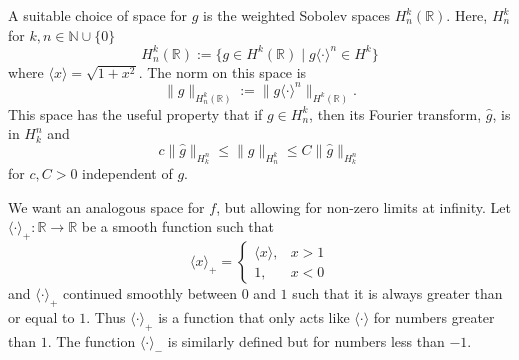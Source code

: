 \documentclass[oneside,reqno]{amsart}
\newcommand{\R}{\mathbb{R}}
\begin{document}
A suitable choice of space for \(g\) is the weighted Sobolev spaces \(H^k_n(\R)\). Here, \(H^k_n\) for \(k,n\in\mathbb N\cup \{0\}\)
\begin{equation*}
	H^k_n(\R) := \{ g\in H^k(\R) \mid   g\langle \cdot \rangle^n \in H^k \}
\end{equation*}
where \(\langle x \rangle = \sqrt{1+x^2}\). The norm on this space is
\begin{equation*}
	\| g \|_{H^k_n(\R)} := \|  g \langle \cdot \rangle^n\|_{H^k(\R)}.
\end{equation*}
This space has the useful property that if \(g \in H^k_n\), then its Fourier transform, \(\hat g \), is in \(H^n_k\) and 
\begin{equation*}
	c \| \hat g \|_{H^n_k} \leq \| g \|_{H^k_n} \leq C \| \hat g \|_{H^n_k}
\end{equation*}
for \(c,C>0\) independent of \(g\).

We want an analogous space for \(f\), but allowing for non-zero limits at infinity. Let \(\langle\cdot \rangle_+ :\R \to \R\) be a smooth function such that
\begin{equation*}
	\langle x \rangle_+ = \begin{cases} \langle x \rangle, & x>1 \\ 1, & x<0\end{cases}
\end{equation*}
and \(\langle \cdot \rangle_+\) continued smoothly between \(0\) and \(1\) such that it is always greater than or equal to \(1\). Thus \(\langle \cdot \rangle_+\) is a function that only acts like \(\langle \cdot \rangle\) for numbers greater than \(1\). The function \(\langle \cdot \rangle_-\) is similarly defined but for numbers less than \(-1\).
\end{document}
